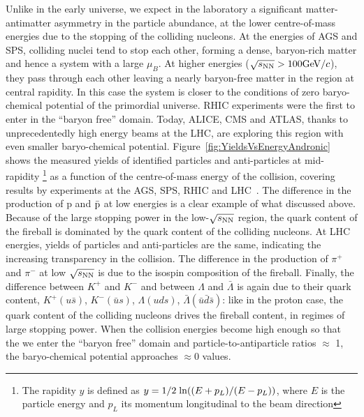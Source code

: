 Unlike in the early universe, we expect in the laboratory a significant matter-antimatter 
asymmetry in the particle abundance, at the lower centre-of-mass energies due to the
stopping of the colliding nucleons. 
At the energies of AGS and SPS, colliding nuclei tend to stop each other, forming a 
dense, baryon-rich matter and hence a system with a large $\mu_{B}$. At higher 
energies ($\sqrt{s_{\rm NN}} > 100 \mathrm{GeV}/c$), they pass through each other leaving a nearly 
baryon-free matter in the region at central rapidity. In this case the system is closer 
to the conditions of zero baryo-chemical potential of the primordial universe. 
RHIC experiments were the first to enter in the  ``baryon free'' domain. Today, ALICE, 
CMS and ATLAS, thanks to unprecedentedly high energy beams at the LHC, are 
exploring this region with even smaller baryo-chemical potential. 
Figure~\ref{fig:YieldsVsEnergyAndronic} shows the measured yields of identified 
particles and anti-particles at mid-rapidity \footnote{The rapidity $y$ is defined as 
\mbox{$y = 1/2 \; {\rm ln}((E+p_{L})/(E-p_{L}))$}, where $E$ is the particle energy 
and $p_{L}$ its momentum longitudinal to the beam direction} as a function of the 
centre-of-mass energy of the collision, covering results by experiments at the 
AGS, SPS, RHIC and LHC~\cite{Andronic:2014zha}. The difference in the production 
of p and $\bar{\rm p}$ at low energies is a clear example of what discussed above. 
Because of the large stopping power in the low-$\sqrt{s_{\rm NN}}$ region, the quark content of
 the fireball is dominated by the quark content of the colliding nucleons. At LHC 
 energies, yields of particles and anti-particles are the same, 
 indicating the increasing transparency in the collision. 
The difference in the production of $\pi^+$ and $\pi^-$ at low $\sqrt{s_{\rm NN}}$ is due to the 
isospin composition of the fireball. Finally, the difference between $K^+$ and $K^-$ 
and between $\Lambda$ and $\bar{\Lambda}$ is again due to their quark content, 
$K^+ (u\bar{s})$, $K^- (\bar{u}s)$, $\Lambda (uds)$, $\bar{\Lambda} (\bar
{u}\bar{d}\bar{s})$: like in the proton case, the quark content of the colliding nucleons
drives the fireball content, in regimes of large stopping power. When the collision energies become 
high enough so that the we enter the ``baryon free'' domain and particle-to-antiparticle ratios $\approx$ 1,
the baryo-chemical potential approaches $\approx 0$ values.


